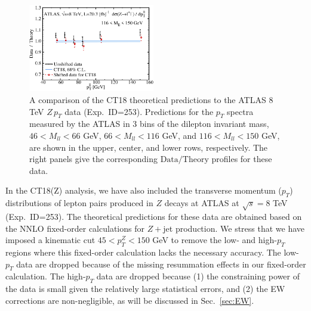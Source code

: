 \begin{figure}[t]
\includegraphics[width=0.49\textwidth]{./fig/data_253_CT18__3_DoT_ect.pdf}
\caption{A comparison of the CT18 theoretical predictions to the ATLAS 8 TeV $Z\, p_{T}$ data (Exp.~ID=253). Predictions for the $p_T$ spectra measured by the ATLAS in
3 bins of the dilepton invariant mass,
$46\! <\! M_{ll}\! <\! 66$ GeV,
$66\! <\! M_{ll}\! <\! 116$ GeV, and
$116\! <\! M_{ll}\! <\! 150$ GeV, are shown in the upper, center, and lower rows, respectively.
The right panels give the corresponding $\mathrm{Data}/\mathrm{Theory}$ profiles
for these data.
\label{fig:id253}}
\end{figure}
%


In the CT18(Z) analysis, we have also included the transverse momentum ($p_{T}$) 
distributions of lepton pairs produced in $Z$ decays at ATLAS at 
$\sqrt{s}=8$ TeV (Exp.~ID=253).
The theoretical predictions for these data are obtained based on the NNLO fixed-order 
calculations for $Z+$jet production. 
We stress that we have imposed a kinematic cut $45<p_T^Z<150$ 
GeV to remove the low- and high-$p_T$ regions where this fixed-order calculation lacks the necessary accuracy.  The low-$p_T$ data are dropped 
because of the missing resummation effects in our fixed-order calculation. 
The high-$p_T$ data are dropped because (1) the constraining power of the data is small given the relatively large statistical errors, and (2) the EW corrections are non-negligible, 
as will be discussed in Sec.~\ref{sec:EW}.

